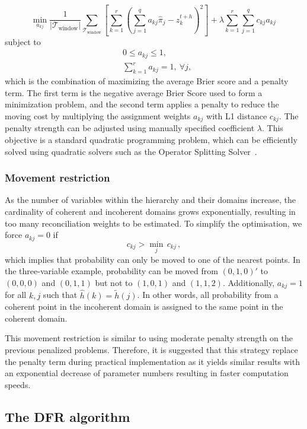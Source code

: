 \documentclass[a4paper,review,12pt,authoryear]{elsarticle}
\begin{document}
    \[
    \underset{a_{kj}}{\min} \frac{1}{|\mathcal{T}_{\textrm{window}}|}\sum\limits_{\mathcal{T}_{\textrm{window}}}\left[\sum\limits_{k=1}^r\left(\sum\limits_{j=1}^q a_{kj}\hat{{\pi}}_j-z^{t+h}_k\right)^2\right] + \lambda\sum\limits_{k=1}^r\sum\limits_{j=1}^q c_{kj}a_{kj}\,
    \]
    subject to
    \begin{align*}
    &0\leq a_{kj}\leq 1,\\
    &\sum\limits_{k=1}^r a_{kj} = 1,~\forall j,
    \end{align*}
    which is the combination of maximizing the average Brier score and a penalty term.
    The first term is the negative average Brier Score used to form a minimization problem, and the second term applies a penalty to reduce the moving cost by multiplying the assignment weights $a_{kj}$ with L1 distance $c_{kj}$. 
    The penalty strength can be adjusted using manually specified coefficient $\lambda$.
    This objective is a standard quadratic programming problem, which can be efficiently solved using quadratic solvers such as the Operator Splitting Solver~\citep[OSQP,][]{stellatoOSQPOperatorSplitting2020}.  

    \subsubsection*{\textbf{Movement restriction}}
    As the number of variables within the hierarchy and their domains increase, the cardinality of coherent and incoherent domains grows exponentially, resulting in too many reconciliation weights to be estimated. 
    To simplify the optimisation, we force $a_{kj}=0$ if 
    \[
      c_{kj}>\underset{j}{\min}\,c_{kj}\,,
    \]  
    which implies that probability can only be moved to one of the nearest points. In the three-variable example, probability can be moved from $(0,1,0)'$ to $(0,0,0)$ and $(0,1,1)$ but not to $(1,0,1)$ and $(1,1,2)$. 
    Additionally, $a_{kj}=1$ for all $k,j$ such that $\hat{h}(k)=\tilde{h}(j)$. 
    In other words, all probability from a coherent point in the incoherent domain is assigned to the same point in the coherent domain.

    This movement restriction is similar to using moderate penalty strength on the previous penalized problems.
    Therefore, it is suggested that this strategy replace the penalty term during practical implementation as it yields similar results with an exponential decrease of parameter numbers resulting in faster computation speeds. 

    \subsection{The DFR algorithm}
    \label{sec:algorithm1}
    
\end{document}
